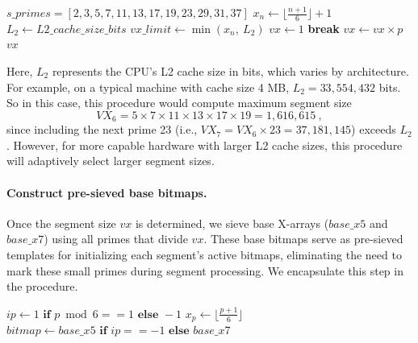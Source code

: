 \documentclass{article}
\begin{document}
\begin{algorithmic}[1]
    \State {} $s\_primes = [2, 3, 5, 7, 11, 13, 17, 19, 23, 29, 31, 37]$ 
        \State $x_n \gets \lfloor\frac{n + 1}{6}\rfloor + 1$ 
        \State $L_2 \gets L2\_cache\_size\_bits$ 
        \State $vx\_limit \gets \min(x_n, \ L_2)$ 
        \State $vx \gets 1$ 
         
             \textbf{break} 
            \EndIf
            \State $vx \gets vx \times p$
        \EndFor
        \State \Return $vx$
    \EndProcedure
\end{algorithmic}
Here, $L_2$ represents the CPU's L2 cache size in bits, which varies by architecture.
For example, on a typical machine with cache size 4 MB, $L_2 = 33,554,432$ bits.
So in this case, this procedure would compute maximum segment size
$$VX_6 = 5 \times 7 \times 11 \times 13 \times 17 \times 19 = 1,616,615 \ ,$$
since including the next prime 23 (i.e., $VX_7 = VX_6 \times 23 = 37,181,145$) exceeds $L_2$. However, for more capable hardware with larger L2 cache sizes, this procedure will adaptively select larger segment sizes.

\paragraph{Construct pre-sieved base bitmaps.}

Once the segment size $vx$ is determined, we sieve base X-arrays ($base\_x5$ and $base\_x7$) using all primes that divide $vx$. 
These base bitmaps serve as pre-sieved templates for initializing each segment's active bitmaps, eliminating the need to mark these small primes during segment processing.
We encapsulate this step in the  procedure.

\begin{algorithmic}[1]
         
            \State $ip \gets 1 \textbf{ if } p \bmod 6 == 1 \textbf{ else } -1$
            \State $x_p \gets \lfloor\frac{p + 1}{6}\rfloor$
            \State $bitmap \gets base\_x5 \textbf{ if } ip == -1 \textbf{ else } base\_x7$ 
            \State {} 
            \State {}
            \State {} 
            \State {}
        \EndFor
    \EndProcedure
\end{algorithmic}
\end{document}
